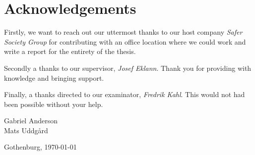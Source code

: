 \thispagestyle{plain}			%
\section*{Acknowledgements}
Firstly, we want to reach out our uttermost thanks to our host company \emph{Safer Society Group} for contributing with an office location where we could work and write a report for the entirety of the thesis. 

Secondly a thanks to our supervisor, \emph{Josef Eklann}. Thank you for providing with knowledge and bringing support. 

Finally, a thanks directed to our examinator, \emph{Fredrik Kahl}. This would not had been possible without your help.

\vspace{1cm}
\begin{flushright}
Gabriel Anderson \\
Mats Uddgård

\vspace{1cm}

Gothenburg, \today
\end{flushright}

\thispagestyle{empty}
\mbox{}